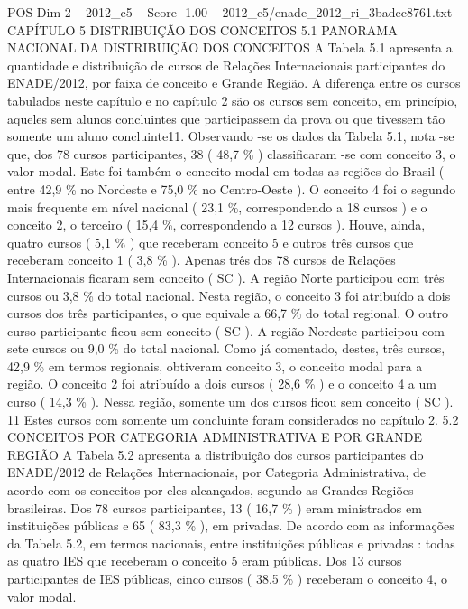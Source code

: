\begin{textsample}{POS Dim 2 – 2012\_c5 – Score -1.00 – 2012\_c5/enade\_2012\_ri\_3badec8761.txt}  \label{ex:f2_pos_355}
CAPÍTULO 5 DISTRIBUIÇÃO DOS CONCEITOS 5.1 PANORAMA NACIONAL DA DISTRIBUIÇÃO DOS CONCEITOS A Tabela 5.1 apresenta a quantidade e distribuição de cursos de Relações Internacionais participantes do ENADE/2012, por faixa de conceito e Grande Região.
A diferença entre os cursos tabulados neste capítulo e no capítulo 2 são os cursos sem conceito, em princípio, aqueles sem alunos concluintes que participassem da prova ou que tivessem tão somente um aluno concluinte11.
Observando -se os dados da Tabela 5.1, nota -se que, dos 78 cursos participantes, 38 ( 48,7 \% ) classificaram -se com conceito 3, o valor modal.
Este foi também o conceito modal em todas as regiões do Brasil ( entre 42,9 \% no Nordeste e 75,0 \% no Centro-Oeste ).
O conceito 4 foi o segundo mais frequente em nível nacional ( 23,1 \%, correspondendo a 18 cursos ) e o conceito 2, o terceiro ( 15,4 \%, correspondendo a 12 cursos ).
Houve, ainda, quatro cursos ( 5,1 \% ) que receberam conceito 5 e outros três cursos que receberam conceito 1 ( 3,8 \% ).
Apenas três dos 78 cursos de Relações Internacionais ficaram sem conceito ( SC ).
A região Norte participou com três cursos ou 3,8 \% do total nacional.
Nesta região, o conceito 3 foi atribuído a dois cursos dos três participantes, o que equivale a 66,7 \% do total regional.
O outro curso participante ficou sem conceito ( SC ).
A região Nordeste participou com sete cursos ou 9,0 \% do total nacional.
Como já comentado, destes, três cursos, 42,9 \% em termos regionais, obtiveram conceito 3, o conceito modal para a região.
O conceito 2 foi atribuído a dois cursos ( 28,6 \% ) e o conceito 4 a um curso ( 14,3 \% ).
Nessa região, somente um dos cursos ficou sem conceito ( SC ). 11 Estes cursos com somente um concluinte foram considerados no capítulo 2. 5.2 CONCEITOS POR CATEGORIA ADMINISTRATIVA E POR GRANDE REGIÃO A Tabela 5.2 apresenta a distribuição dos cursos participantes do ENADE/2012 de Relações Internacionais, por Categoria Administrativa, de acordo com os conceitos por eles alcançados, segundo as Grandes Regiões brasileiras.
Dos 78 cursos participantes, 13 ( 16,7 \% ) eram ministrados em instituições públicas e 65 ( 83,3 \% ), em privadas.
De acordo com as informações da Tabela 5.2, em termos nacionais, entre instituições públicas e privadas : todas as quatro IES que receberam o conceito 5 eram públicas.
Dos 13 cursos participantes de IES públicas, cinco cursos ( 38,5 \% ) receberam o conceito 4, o valor modal.

\end{textsample}
